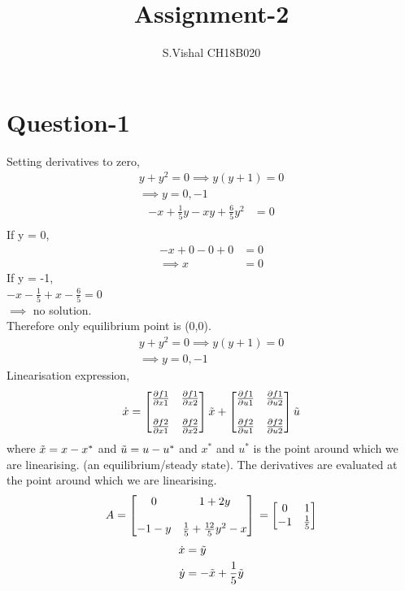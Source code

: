 \documentclass{article}
\title{Assignment-2}
\author{S.Vishal CH18B020}
\begin{document}
\maketitle
\section*{Question-1}
Setting derivatives to zero,
\begin{align*}
    y + y^2 = 0 \implies y(y+1) = 0 \\
    \implies y = 0, -1
\end{align*}
\begin{align*}
    - x + \frac{1}{5}y - xy + \frac{6}{5}y^2 &= 0 \\
\end{align*}
If y = 0,
\begin{align*}
    - x + 0 - 0 + 0 &= 0 \\
    \implies x &= 0
\end{align*}
If y = -1, \\
$- x - \frac{1}{5} + x - \frac{6}{5} = 0$ \\
$\implies$ no solution. \\
Therefore only equilibrium point is (0,0). \\
\begin{align*}
    y + y^2 = 0 \implies y(y+1) = 0 \\
    \implies y = 0, -1
\end{align*}
Linearisation expression, 
\begin{align}
    \dot{x} = \begin{bmatrix}
\frac{\partial f1}{\partial x1} & \frac{\partial f1}{\partial x2}\\\\
\frac{\partial f2}{\partial x1} & \frac{\partial f2}{\partial x2} 
\end{bmatrix} \Tilde{x} + \begin{bmatrix}\frac{\partial f1}{\partial u1} & \frac{\partial f1}{\partial u2}\\\\
\frac{\partial f2}{\partial u1} & \frac{\partial f2}{\partial u2} \end{bmatrix}\Tilde{u}
\label{lineqn}
\end{align} 
where $\Tilde{x} = x - x^{*}$ and $\Tilde{u} = u - u^{*}$ and $x^{*}$ and $u^{*}$ is the point around which we are linearising. (an equilibrium/steady state). The derivatives are evaluated at the point around which we are linearising.
\[A = \begin{bmatrix}
0 & 1 + 2y\\\\
-1 - y & \frac{1}{5} + \frac{12}{5}y^2 - x
\end{bmatrix} \\
= \begin{bmatrix}
0 & 1\\
-1 & \frac{1}{5}
\end{bmatrix} \]
\begin{align*}
    \dot{x} &= \Tilde{y} \\
    \dot{y} &= - \Tilde{x} + \frac{1}{5}\Tilde{y}
\end{align*}
\end{document}
